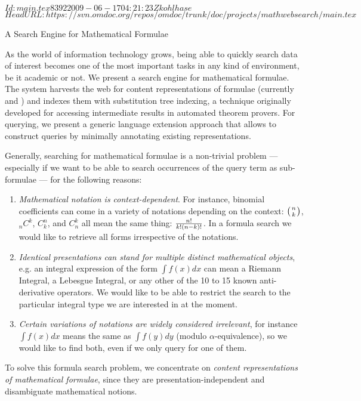 \svnInfo $Id: main.tex 8392 2009-06-17 04:21:23Z kohlhase $
\svnKeyword $HeadURL: https://svn.omdoc.org/repos/omdoc/trunk/doc/projects/mathwebsearch/main.tex $

\begin{omgroup}[id=mathwebsearch,creators={isucan,miko}]{A Search Engine for Mathematical Formulae}

As the world of information technology grows, being able to quickly search data of
interest becomes one of the most important tasks in any kind of environment, be it
academic or not. We present a search engine for mathematical formulae. The {\mmlsearch}
system harvests the web for content representations of formulae (currently {\mathml} and
{\openmath}) and indexes them with substitution tree indexing, a technique originally
developed for accessing intermediate results in automated theorem provers. For querying,
we present a generic language extension approach that allows to construct queries by
minimally annotating existing representations.

Generally, searching for mathematical formulae is a non-trivial problem --- especially if
we want to be able to search occurrences of the query term as sub-formulae --- for the
following reasons:
\begin{enumerate}
\item {\emph{Mathematical notation is context-dependent}}. For instance, binomial
  coefficients can come in a variety of notations depending on the context: $\left(n\atop
    k\right)$, $_nC^k$, $C^n_k$, and $C^k_n$ all mean the same thing: $n!\over k!(n-k)!$.
  In a formula search we would like to retrieve all forms irrespective of the notations.
\item {\emph{Identical presentations can stand for multiple distinct mathematical
      objects}}, e.g. an integral expression of the form $\int f(x) dx$ can mean a Riemann
  Integral, a Lebesgue Integral, or any other of the 10 to 15 known anti-derivative
  operators.  We would like to be able to restrict the search to the particular integral
  type we are interested in at the moment.
\item {\emph{Certain variations of notations are widely considered irrelevant}}, for
  instance $\int f(x) dx$ means the same as $\int f(y) dy$ (modulo $\alpha$-equivalence),
  so we would like to find both, even if we only query for one of them.
\end{enumerate}
To solve this formula search problem, we concentrate on {\emph{content representations of
    mathematical formulae}}, since they are presentation-independent and disambiguate
mathematical notions.


\end{omgroup}
